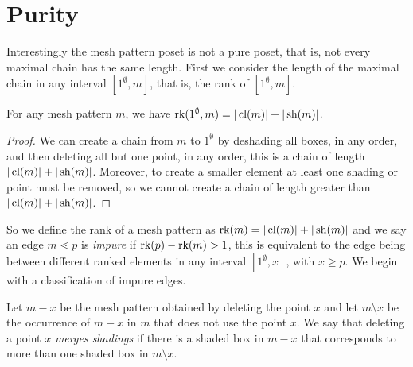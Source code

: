 \documentclass[11pt,a4paper,oneside]{article}
\begin{document}
\section{Purity}

Interestingly the mesh pattern poset is not a pure poset, that is, not every
maximal chain has the same length. First we consider the length of the maximal chain in
any interval $[1^\emptyset,m]$, that is, the rank of $[1^\emptyset,m]$.
\begin{lem}
For any mesh pattern $m$, we have $\operatorname{\textrm{rk}}(1^\emptyset,m)=|\operatorname{\textrm{cl}}(m)|+|\operatorname{\textrm{sh}}(m)|$.
\begin{proof}
We can create a chain from $m$ to $1^\emptyset$ by deshading all boxes, in any order,
and then deleting all but one point, in any order, this is a chain of length $|\operatorname{\textrm{cl}}(m)|+|\operatorname{\textrm{sh}}(m)|$.
Moreover, to create a smaller element at least one shading or point must be removed, so we cannot create a chain of length greater than $|\operatorname{\textrm{cl}}(m)|+|\operatorname{\textrm{sh}}(m)|$.
\end{proof}
\end{lem}

So we define the rank of a mesh pattern as $\operatorname{\textrm{rk}}(m)=|\operatorname{\textrm{cl}}(m)|+|\operatorname{\textrm{sh}}(m)|$ and we say an 
edge $m\lessdot p$ is \emph{impure} if $\operatorname{\textrm{rk}}(p)-\operatorname{\textrm{rk}}(m)>1$, this is equivalent
to the edge being between different ranked elements in any interval $[1^\emptyset,x]$, with $x\ge p$.
We begin with a classification of impure edges.

 Let $m-x$ be the mesh pattern obtained by deleting the
point $x$ and let $m\setminus x$ be the occurrence of $m-x$ in $m$ that does not
use the point $x$. We say that deleting a point $x$ \emph{merges shadings} if
there is a shaded box in $m-x$ that corresponds to more than one shaded box in
$m\setminus x$.
\end{document}
